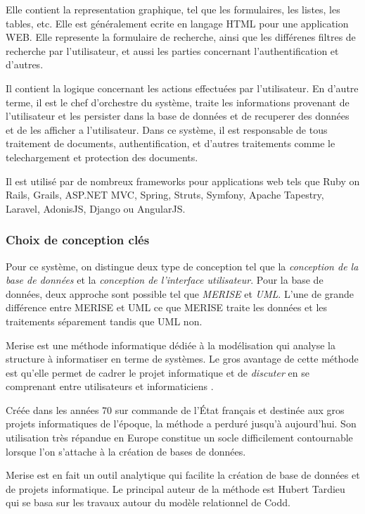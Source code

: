 Elle contient la representation graphique, tel que les formulaires, les listes, les tables, etc. Elle est généralement ecrite en langage HTML pour une application WEB\@. Elle represente la formulaire de recherche, ainsi que les différenes filtres de recherche par l'utilisateur, et aussi les parties concernant l'authentification et d'autres.

Il contient la logique concernant les actions effectuées par l'utilisateur. En d'autre terme, il est le chef d'orchestre du système, traite les informations provenant de l'utilisateur et les persister dans la base de données et de recuperer des données et de les afficher a l'utilisateur. Dans ce système, il est responsable de tous traitement de documents, authentification, et d'autres traitements comme le telechargement et protection des documents.

Il est utilisé par de nombreux frameworks pour applications web tels que Ruby on Rails, Grails, ASP.NET MVC, Spring, Struts, Symfony, Apache Tapestry, Laravel, AdonisJS, Django ou AngularJS\@.

\subsubsection{Choix de conception clés}
Pour ce système, on distingue deux type de conception tel que la \emph{conception de la base de données} et la \emph{conception de l'interface utilisateur}. Pour la base de données, deux approche sont possible tel que \emph{MERISE} et \emph{UML}. L'une de grande différence entre MERISE et UML ce que MERISE traite les données et les traitements séparement tandis que UML non.

Merise est une méthode informatique dédiée à la modélisation qui analyse la structure à informatiser en terme de systèmes. Le gros avantage de cette méthode est qu’elle permet de cadrer le projet informatique et de \emph{discuter} en se comprenant entre utilisateurs et informaticiens \citep*{base-de-donnees}.

Créée dans les années 70 sur commande de l’État français et destinée aux gros projets informatiques de l’époque, la méthode a perduré jusqu’à aujourd’hui. Son utilisation très répandue en Europe constitue un socle difficilement contournable lorsque l’on s’attache à la création de bases de données.

Merise est en fait un outil analytique qui facilite la création de base de données et de projets informatique. Le principal auteur de la méthode est Hubert Tardieu qui se basa sur les travaux autour du modèle relationnel de Codd.

